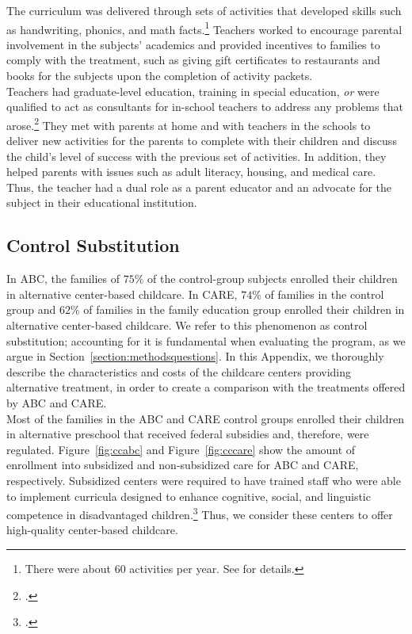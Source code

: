 \noindent The curriculum was delivered through sets of activities that developed skills such as handwriting, phonics, and math facts.\footnote{There were about 60 activities per year. See \cite{Campbell-Ramey_1989_Preschool-vs-School-age} for details.} Teachers worked to encourage parental involvement in the subjects' academics and provided incentives to families to comply with the treatment, such as giving gift certificates to restaurants and books for the subjects upon the completion of activity packets. \\

\noindent Teachers had graduate-level education, training in special education, \textit{or} were qualified to act as consultants for in-school teachers to address any problems that arose.\footnote{\cite{Ramey_Campbell_1991_childreninpoverty}.} They met with parents at home and with teachers in the schools to deliver new activities for the parents to complete with their children and discuss the child's level of success with the previous set of activities. In addition, they helped parents with issues such as adult literacy, housing, and medical care. Thus, the teacher had a dual role as a parent educator and an advocate for the subject in their educational institution.

\subsection{Control Substitution}\label{app:control-subbb}

\noindent In ABC, the families of $75\%$ of the control-group subjects enrolled their children in alternative center-based childcare. In CARE, $74\%$ of families in the control group and $62\%$ of families in the family education group enrolled their children in alternative center-based childcare. We refer to this phenomenon as control substitution; accounting for it is fundamental when evaluating the program, as we argue in Section~\ref{section:methodsquestions}. In this Appendix, we thoroughly describe the characteristics and costs of the childcare centers providing alternative treatment, in order to create a comparison with the treatments offered by ABC and CARE.\\

\noindent Most of the families in the ABC and CARE control groups enrolled their children in alternative preschool that received federal subsidies and, therefore, were regulated. Figure~\ref{fig:ccabc} and Figure~\ref{fig:cccare} show the amount of enrollment into subsidized and non-subsidized care for ABC and CARE, respectively. Subsidized centers were required to have trained staff who were able to implement curricula designed to enhance cognitive, social, and linguistic competence in disadvantaged children.\footnote{\citet{Burchinal_etal_1989_CD_Daycare-Pre-K-Dev}.} Thus, we consider these centers to offer high-quality center-based childcare.

